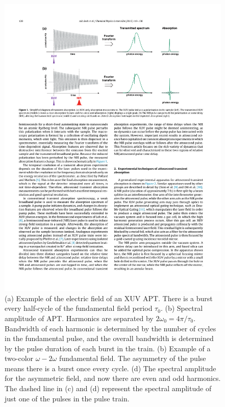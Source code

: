 \begin{figure}
	\centering
	\includegraphics[width=1.0\textwidth]{figures/Introduction/gas_TA_sketch.pdf}
	\caption[Example electric field of XUV APT and its frequency spectrum]{(a) Example of the electric field of an XUV APT.  There is a burst every half-cycle of the fundamental field period $\tau_0$.  (b)  Spectral amplitude of APT.  Harmonics are separated by $2\omega_0=4\pi/\tau_0$.  Bandwidth of each harmonic is determined by the number of cycles in the fundamental pulse, and the overall bandwidth is determined by the pulse duration of each burst in the train. (b) Example of a two-color $\omega-2\omega$ fundamental field.  The asymmetry of the pulse means there is a burst once every cycle. (d) The spectral amplitude for the asymmetric field, and now there are even and odd harmonics.  The dashed line in (c) and (d) represent the spectral amplitude of just one of the pulses in the pulse train.}
	\label{fig:gas_TA_sketch}
\end{figure}

